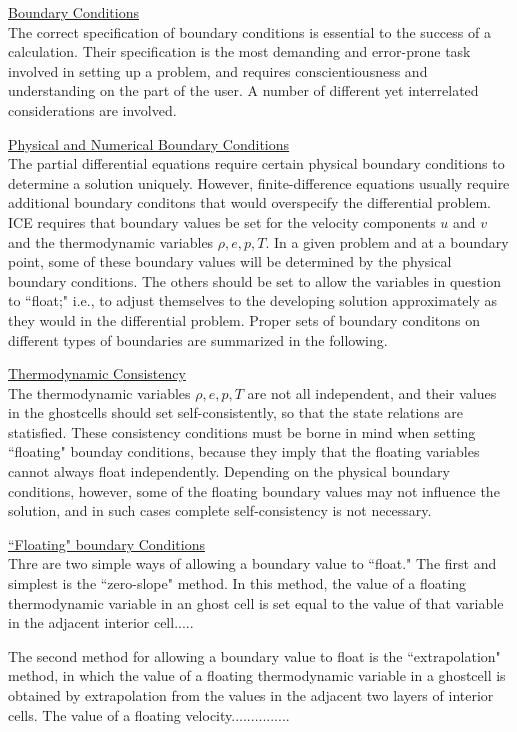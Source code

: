 \documentclass[fleqn]{article}
\begin{document}
{\underline{Boundary Conditions}\\
The correct specification of boundary conditions is essential to the success
of a calculation.  Their specification is the most demanding and error-prone
task involved in setting up a problem, and requires conscientiousness and
understanding on the part of the user.  A number of different yet interrelated
considerations are involved.

\underline{Physical and Numerical Boundary Conditions}\\
The partial differential equations require certain physical boundary conditions
to determine a solution uniquely.  However, finite-difference equations
usually require additional boundary conditons that would overspecify the
differential problem.  ICE requires that boundary values be set for the
velocity components $u$ and $v$ and the thermodynamic variables $\rho, e,
p, T$.  In a given problem and at a boundary point, some of these boundary
values will be determined by the physical boundary conditions.  The others
should be set to allow the variables in question to ``float;" i.e., to adjust
themselves to the developing solution approximately as they would in the
differential problem.  Proper sets of boundary conditons on different types
of boundaries are summarized in the following.

\underline{Thermodynamic Consistency}\\
The thermodynamic variables $\rho, e, p, T$ are not all independent, and
their values in the ghostcells should set self-consistently, so that the
state relations are statisfied.  These consistency conditions must be borne
in mind when setting ``floating" bounday conditions, because they imply that
the floating variables cannot always float independently.  Depending on the
physical boundary conditions, however, some of the floating boundary values
may not influence the solution, and in such cases complete self-consistency
is not necessary.

\underline{``Floating" boundary Conditions}\\
Thre are two simple ways of allowing a boundary value to ``float."  The first
and simplest is the ``zero-slope" method.  In this method, the value of a
floating thermodynamic variable in an ghost cell is set equal to the value
of that variable in the adjacent interior cell.....

The second method for allowing a boundary value to float is the
``extrapolation" method, in which the value of a floating thermodynamic
variable in a ghostcell is obtained by extrapolation from the values
in the adjacent two layers of interior cells.  The value of a floating
velocity...............

}
\end{document}

